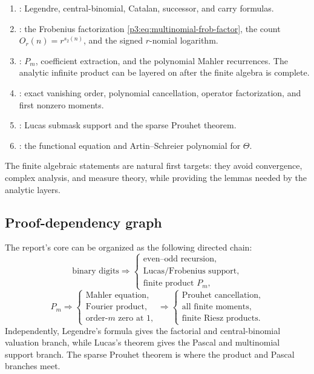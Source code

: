 \documentclass[11pt,oneside]{article}
\theoremstyle{definition}
\theoremstyle{remark}
\newcommand{\swt}{s_2}
\newcommand{\1}{\mathbf 1}
\begin{document}
\begin{enumerate}
\item {}: Legendre, central-binomial, Catalan, successor, and carry
      formulas.
\item {}: the Frobenius factorization
      \eqref{p3:eq:multinomial-frob-factor}, the count \(O_r(n)=r^{\swt(n)}\), and the signed
      \(r\)-nomial logarithm.
\item {}: \(P_m\), coefficient extraction, and the
      polynomial Mahler recurrences.  The analytic infinite product can be layered on after
      the finite algebra is complete.
\item {}: exact vanishing order, polynomial cancellation, operator
      factorization, and first nonzero moments.
\item {}: Lucas submask support and the sparse Prouhet theorem.
\item {}: the functional equation and Artin--Schreier
      polynomial for \(\Theta\).
\end{enumerate}

The finite algebraic statements are natural first targets: they avoid convergence, complex
analysis, and measure theory, while providing the lemmas needed by the analytic layers.

\subsection{Proof-dependency graph}

The report's core can be organized as the following directed chain:
\[
 \text{binary digits}
 \Longrightarrow
 \begin{cases}
  \text{even--odd recursion},\\
  \text{Lucas/Frobenius support},\\
  \text{finite product }P_m,
 \end{cases}
\]
\[
 P_m
 \Longrightarrow
 \begin{cases}
  \text{Mahler equation},\\
  \text{Fourier product},\\
  \text{order-}\!m\text{ zero at }1,
 \end{cases}
 \Longrightarrow
 \begin{cases}
  \text{Prouhet cancellation},\\
  \text{all finite moments},\\
  \text{finite Riesz products}.
 \end{cases}
\]
Independently, Legendre's formula gives the factorial and central-binomial valuation branch,
while Lucas's theorem gives the Pascal and multinomial support branch.  The sparse Prouhet
theorem is where the product and Pascal branches meet.
\end{document}
